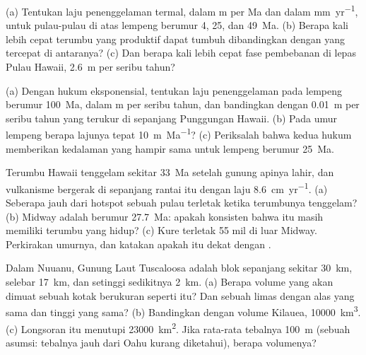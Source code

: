 \begin{exercise}[$\star\star$]\label{exo:b2:oceanic-islands:5}
(a) Tentukan laju penenggelaman termal, dalam \unit{m} per \unit{Ma} dan dalam \unit{mm.yr^{-1}}, untuk
pulau-pulau di atas lempeng berumur 4, 25, dan \qty{49}{Ma}. (b) Berapa kali lebih cepat terumbu yang produktif dapat tumbuh
dibandingkan dengan yang tercepat di antaranya? (c) Dan berapa kali lebih cepat fase pembebanan di lepas Pulau
Hawaii, \qty{2.6}{m} per seribu tahun?
\end{exercise}

\begin{exercise}[$\star\star$]\label{exo:b2:oceanic-islands:6}
(a) Dengan hukum eksponensial, tentukan laju penenggelaman pada lempeng berumur \qty{100}{Ma}, dalam \unit{m}
per seribu tahun, dan bandingkan dengan \qty{0.01}{m} per seribu tahun yang terukur di sepanjang
Punggungan Hawaii. (b) Pada umur lempeng berapa lajunya tepat \qty{10}{m.Ma^{-1}}? (c) Periksalah bahwa
kedua hukum memberikan kedalaman yang hampir sama untuk lempeng berumur \qty{25}{Ma}.
\end{exercise}

\begin{exercise}[$\star\star$]\label{exo:b2:oceanic-islands:7}
Terumbu Hawaii tenggelam sekitar \qty{33}{Ma} setelah gunung apinya lahir, dan vulkanisme bergerak
di sepanjang rantai itu dengan laju \qty{8.6}{cm.yr^{-1}}. (a) Seberapa jauh dari hotspot sebuah pulau terletak ketika
terumbunya tenggelam? (b) Midway adalah  berumur \qty{27.7}{Ma}: apakah konsisten bahwa  itu masih memiliki
terumbu yang hidup? (c) Kure terletak 55 mil di luar Midway. Perkirakan umurnya, dan katakan apakah  itu dekat
dengan .
\end{exercise}

\begin{exercise}[$\star\star$]\label{exo:b2:oceanic-islands:8}
Dalam  Nuuanu, Gunung Laut Tuscaloosa adalah blok sepanjang sekitar \qty{30}{km},
selebar \qty{17}{km}, dan setinggi sedikitnya \qty{2}{km}. (a) Berapa volume yang akan dimuat sebuah kotak berukuran
seperti itu? Dan sebuah limas dengan alas yang sama dan tinggi yang sama? (b) Bandingkan dengan volume
Kilauea, \qty{10000}{km^3}. (c) Longsoran itu menutupi \qty{23000}{km^2}. Jika rata-rata tebalnya
\qty{100}{m} (sebuah asumsi: tebalnya jauh dari Oahu kurang diketahui), berapa
volumenya?
\end{exercise}

